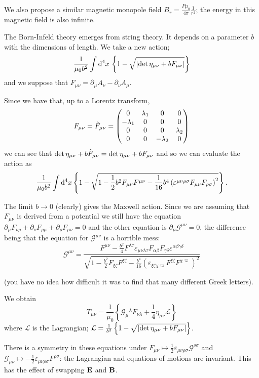 \documentclass{notes}
\newcommand{\cG}{\mathcal{G}}
\newcommand{\B}{\vect{B}}
\newcommand{\cL}{\mathcal{L}}
\newcommand{\E}{\vect{E}}
\begin{document}
We also propose a similar magnetic monopole field $B_r = \frac{P \mu_0}{4
\pi} \frac{1}{r^2}$; the energy in this magnetic field is also infinite.

The Born-Infeld theory emerges from string theory.  It depends on
a parameter $b$ with the dimensions of length.  We take a new action;
\[
\frac{1}{\mu_0 b^2} \int \mathrm{d}^4 x\,\left\{ 1 - \sqrt{\left|\det{\eta_{\mu \nu}
+ b F_{\mu\nu}}\right|} \right\}
\]
and we suppose that $F_{\mu \nu} = \partial_\mu A_\nu - \partial_\nu A_\mu$.

Since we have that, up to a Lorentz transform,
\[
F_{\mu \nu} = \Tilde{F}_{\mu \nu} = \begin{pmatrix} 0 & \lambda_1 & 0 & 0 \\
-\lambda_1 & 0 & 0 & 0 \\
0 & 0 & 0 & \lambda_2 \\
0 & 0 & -\lambda_2 & 0
\end{pmatrix}
\]
we can see that $\det \eta_{\mu \nu} + b \Tilde{F}_{\mu \nu} = \det
\eta_{\mu \nu} + b F_{\mu \nu}$ and so we can evaluate the action as
\[
\frac{1}{\mu_0 b^2} \int \mathrm{d}^4 x  \left\{
1 - \sqrt{1 - \frac{1}{2} b^2 F_{\mu \nu} F^{\mu \nu} - \frac{1}{16}
b^4 \left( \varepsilon^{\mu \nu \rho \sigma} F_{\mu \nu} F_{\rho \sigma}
\right)^2 } \right\}.
\]

The limit $b \to 0$ (clearly) gives the Maxwell action.  Since we
are assuming that $F_{\mu \nu}$ is derived from a potential we still have
the equation $\partial_\mu F_{\nu \rho} + \partial_\nu F_{\rho \mu}
+ \partial_\rho F_{\mu \nu} = 0$ and the other equation is
$\partial_\mu \cG^{\mu \nu} = 0$, the difference being that
the equation for $\cG^{\mu \nu}$ is a horrible mess:
\[
\cG^{\mu \nu} = \frac{F^{\mu \nu} - \tfrac{b^2}{4} F^{\lambda \tau}
\varepsilon_{\mu \nu \lambda \tau} F_{\alpha \beta} F_{\gamma \delta}
\varepsilon^{\alpha \beta \gamma \delta}}{
\sqrt{1 - \frac{b^2}{2} F_{\xi \zeta} F^{\xi \zeta} - \frac{b^4}{16}
\left( \varepsilon_{\xi \zeta \chi \varpi} F^{\xi \zeta} F^{\chi
\varpi} \right)^2}}
\]

(you have no idea how difficult it was to find that many different Greek
letters).

We obtain
\[
T_{\mu \nu} = \frac{1}{\mu_0} \left\{ \cG_\mu{}^\lambda F_{\nu \lambda}
 + \frac{1}{4} \eta_{\mu \nu} \cL \right\}
\]
where $\cL$ is the Lagrangian; $\cL = \frac{1}{b^2} \left\{
1- \sqrt{\abs{\det \eta_{\mu \nu} + b F_{\mu \nu}}} \right\}$.

There is a symmetry in these equations under $F_{\mu \nu}
\mapsto \frac{1}{2} \varepsilon_{\mu \nu \rho \sigma} \cG^{\rho \sigma}$
and $\cG_{\mu \nu} \mapsto - \frac{1}{2} \varepsilon_{\mu \nu \rho \sigma}
F^{\rho \sigma}$:
the Lagrangian and equations of motions are invariant.  This has the effect
of swapping $\E$ and $\B$.
\end{document}
